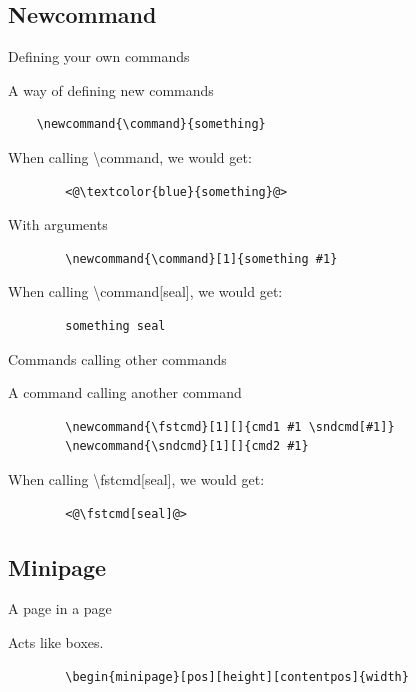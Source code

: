\subsection{Newcommand}
\begin{frame}[fragile]{Defining your own commands}
	\begin{block}{A way of defining new commands}
	\begin{lstlisting}
	\newcommand{\command}{something}
	\end{lstlisting}
		When calling \textbackslash command, we would get: 
		\begin{lstlisting}
		<@\textcolor{blue}{something}@>
		\end{lstlisting}
	\end{block}
   	\begin{block}{With arguments}
   		\begin{lstlisting}
		\newcommand{\command}[1]{something #1}
		\end{lstlisting}
		When calling \textbackslash command[seal], we would get:	
		\begin{lstlisting}
		something seal
		\end{lstlisting}
   \end{block}
\end{frame}

\begin{frame}[fragile]{Commands calling other commands}
	\begin{block}{A command calling another command}
	   	\begin{lstlisting}
		\newcommand{\fstcmd}[1][]{cmd1 #1 \sndcmd[#1]}
		\newcommand{\sndcmd}[1][]{cmd2 #1}
		\end{lstlisting}
		When calling \textbackslash fstcmd[seal], we would get: 
		\begin{lstlisting}
		<@\fstcmd[seal]@>
		\end{lstlisting}
   \end{block}
\end{frame}

\subsection{Minipage}
\begin{frame}[fragile]{A page in a page}
	\begin{block}{Acts like boxes.}
	\begin{lstlisting}
		\begin{minipage}[pos][height][contentpos]{width}
	\end{lstlisting}
   \end{block}
\end{frame}

